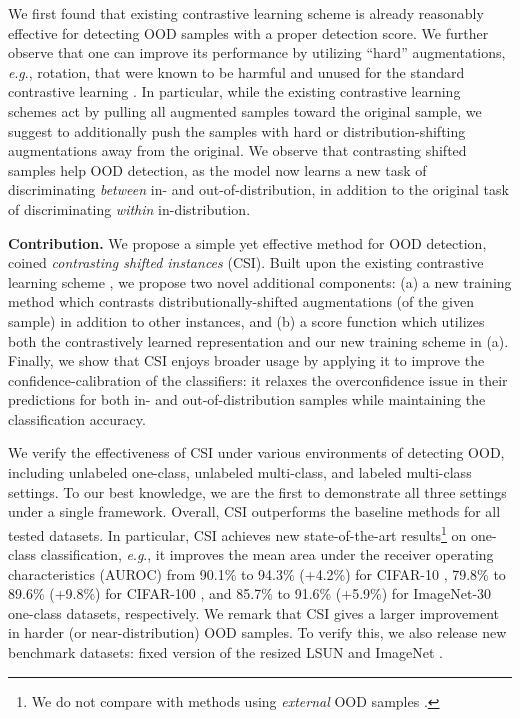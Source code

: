 \documentclass{article}
\newcommand{\eg}{\textit{e}.\textit{g}.}
\begin{document}
We first found that existing contrastive learning scheme 
is already reasonably effective for detecting OOD samples with a proper detection score. We further observe that one can improve its performance by utilizing ``hard'' augmentations, \eg, rotation, that were known to be harmful and unused for the standard contrastive learning \citep{chen2020simple}. In particular, while the
existing contrastive learning schemes act by pulling all augmented samples toward the original sample, we suggest to additionally push the samples with hard or distribution-shifting augmentations away from the original. We observe that contrasting shifted samples help OOD detection, as the model now learns a new task of discriminating \textit{between} in- and out-of-distribution, in addition to the original task of discriminating \textit{within} in-distribution.

\textbf{Contribution.}
We propose a simple yet effective method for OOD detection, coined \emph{contrasting shifted instances} (CSI). Built upon the existing contrastive learning scheme \citep{chen2020simple}, we propose two novel additional components: (a) a new training method which contrasts distributionally-shifted augmentations (of the given sample) in addition to other instances, and (b) a score function which utilizes both the contrastively learned representation and our new training scheme in (a). Finally, we show that CSI enjoys broader usage by applying it to improve the confidence-calibration of the classifiers: it relaxes the overconfidence issue in their predictions for both in- and out-of-distribution samples while maintaining the classification accuracy.

We verify the effectiveness of CSI under various environments of detecting OOD, including unlabeled one-class, unlabeled multi-class, and labeled multi-class settings. To our best knowledge, we are the first to demonstrate all three settings under a single framework. Overall, CSI outperforms the baseline methods for all tested datasets. In particular, CSI achieves new state-of-the-art results\footnote{We do not compare with methods using \textit{external} OOD samples \citep{hendrycks2019deep,ruff2020deep}.} on one-class classification, \eg, it improves the mean area under the receiver operating characteristics (AUROC) from 90.1\% to 94.3\% (+4.2\%) for CIFAR-10 \citep{krizhevsky2009learning}, 79.8\% to 89.6\% (+9.8\%) for CIFAR-100 \citep{krizhevsky2009learning}, and 85.7\% to 91.6\% (+5.9\%) for ImageNet-30 \citep{hendrycks2019using_self} one-class datasets, respectively. We remark that CSI gives a larger improvement in harder (or near-distribution) OOD samples. To verify this, we also release new benchmark datasets: fixed version of the resized LSUN and ImageNet \citep{liang2018enhancing}.
\end{document}
